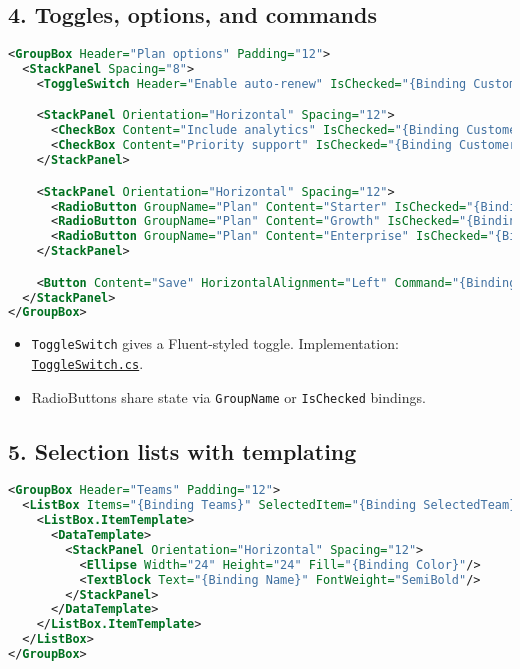\subsection{4. Toggles, options, and
commands}\label{toggles-options-and-commands}

\begin{lstlisting}[language=XML]
<GroupBox Header="Plan options" Padding="12">
  <StackPanel Spacing="8">
    <ToggleSwitch Header="Enable auto-renew" IsChecked="{Binding Customer.AutoRenew}"/>

    <StackPanel Orientation="Horizontal" Spacing="12">
      <CheckBox Content="Include analytics" IsChecked="{Binding Customer.IncludeAnalytics}"/>
      <CheckBox Content="Priority support" IsChecked="{Binding Customer.IncludeSupport}"/>
    </StackPanel>

    <StackPanel Orientation="Horizontal" Spacing="12">
      <RadioButton GroupName="Plan" Content="Starter" IsChecked="{Binding Customer.IsStarter}"/>
      <RadioButton GroupName="Plan" Content="Growth" IsChecked="{Binding Customer.IsGrowth}"/>
      <RadioButton GroupName="Plan" Content="Enterprise" IsChecked="{Binding Customer.IsEnterprise}"/>
    </StackPanel>

    <Button Content="Save" HorizontalAlignment="Left" Command="{Binding SaveCommand}"/>
  </StackPanel>
</GroupBox>
\end{lstlisting}

\begin{itemize}
\tightlist
\item
  \passthrough{\lstinline!ToggleSwitch!} gives a Fluent-styled toggle.
  Implementation:
  \href{https://github.com/AvaloniaUI/Avalonia/blob/master/src/Avalonia.Controls/ToggleSwitch.cs}{\passthrough{\lstinline!ToggleSwitch.cs!}}.
\item
  RadioButtons share state via \passthrough{\lstinline!GroupName!} or
  \passthrough{\lstinline!IsChecked!} bindings.
\end{itemize}

\subsection{5. Selection lists with
templating}\label{selection-lists-with-templating}

\begin{lstlisting}[language=XML]
<GroupBox Header="Teams" Padding="12">
  <ListBox Items="{Binding Teams}" SelectedItem="{Binding SelectedTeam}" Height="160">
    <ListBox.ItemTemplate>
      <DataTemplate>
        <StackPanel Orientation="Horizontal" Spacing="12">
          <Ellipse Width="24" Height="24" Fill="{Binding Color}"/>
          <TextBlock Text="{Binding Name}" FontWeight="SemiBold"/>
        </StackPanel>
      </DataTemplate>
    </ListBox.ItemTemplate>
  </ListBox>
</GroupBox>
\end{lstlisting}

